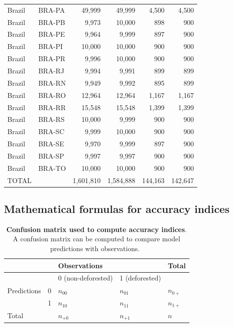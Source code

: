 \documentclass[12pt,]{article}
\begin{document}
\begin{longtable}[t]{llrrrr}
Brazil & BRA-PA & 49,999 & 49,999 & 4,500 & 4,500\\
\rowcolor{gray!6}  Brazil & BRA-PB & 9,973 & 10,000 & 898 & 900\\
Brazil & BRA-PE & 9,964 & 9,999 & 897 & 900\\
\rowcolor{gray!6}  Brazil & BRA-PI & 10,000 & 10,000 & 900 & 900\\
Brazil & BRA-PR & 9,996 & 10,000 & 900 & 900\\
\rowcolor{gray!6}  Brazil & BRA-RJ & 9,994 & 9,991 & 899 & 899\\
Brazil & BRA-RN & 9,949 & 9,992 & 895 & 899\\
\rowcolor{gray!6}  Brazil & BRA-RO & 12,964 & 12,964 & 1,167 & 1,167\\
Brazil & BRA-RR & 15,548 & 15,548 & 1,399 & 1,399\\
\rowcolor{gray!6}  Brazil & BRA-RS & 10,000 & 9,999 & 900 & 900\\
Brazil & BRA-SC & 9,999 & 10,000 & 900 & 900\\
\rowcolor{gray!6}  Brazil & BRA-SE & 9,970 & 9,999 & 897 & 900\\
Brazil & BRA-SP & 9,997 & 9,997 & 900 & 900\\
\rowcolor{gray!6}  Brazil & BRA-TO & 10,000 & 10,000 & 900 & 900\\
TOTAL &  & 1,601,810 & 1,584,888 & 144,163 & 142,647\\
\bottomrule
\end{longtable}
\endgroup{}

\hypertarget{mathematical-formulas-for-accuracy-indices}{%
\subsection{Mathematical formulas for accuracy indices}\label{mathematical-formulas-for-accuracy-indices}}



\begin{table}[H]

\caption{\label{tab:confusion-matrix}\textbf{Confusion matrix used to compute accuracy indices}. A confusion matrix can be computed to compare model predictions with observations.\vspace{0.5cm}~}
\centering
\begin{tabular}[t]{lllll}
\toprule
 &  & Observations &  & Total\\
\midrule
\rowcolor{gray!6}   &  & 0 (non-deforested) & 1 (deforested) & \\
Predictions & 0 & $n_{00}$ & $n_{01}$ & $n_{0+}$\\
\rowcolor{gray!6}   & 1 & $n_{10}$ & $n_{11}$ & $n_{1+}$\\
Total &  & $n_{+0}$ & $n_{+1}$ & $n$\\
\bottomrule
\end{tabular}
\end{table}
\end{document}
